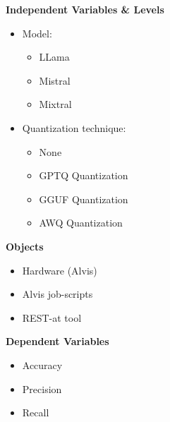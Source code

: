 \documentclass[conference]{IEEEtran}
\begin{document}
\begin{figure}[h]
\begin{center}
    \begin{tcbraster}[raster columns=2, raster column skip=5pt, raster equal height=rows, raster row skip=5pt]
        \begin{roundedBox}
            \centering
            \textbf{Independent Variables \& Levels}
            \begin{itemize}
                \item Model:
                \begin{itemize}
                    \item LLama
                    \item Mistral
                    \item Mixtral
                \end{itemize}
                \item Quantization technique:
                \begin{itemize}
                    \item None
                    \item GPTQ Quantization
                    \item GGUF Quantization
                    \item AWQ Quantization
                \end{itemize}
            \end{itemize}
        \end{roundedBox}
        \begin{roundedBox}
            \centering
            \textbf{Objects}
            \begin{itemize}
                \item Hardware (Alvis)
                \item Alvis job-scripts
                \item REST-at tool
            \end{itemize}
        \end{roundedBox}
        \begin{roundedBox}
            \centering
            \textbf{Dependent Variables}
            \begin{itemize}
                \item Accuracy
                \item Precision
                \item Recall

\end{itemize}
\end{roundedBox}
\end{tcbraster}
\end{center}
\end{figure}
\end{document}
